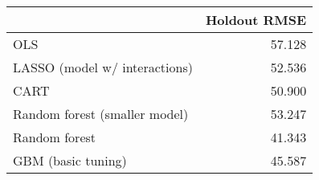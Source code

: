 
\begin{tabular}{lr}
\toprule
  & Holdout RMSE\\
\midrule
OLS & 57.128\\
LASSO (model w/ interactions) & 52.536\\
CART & 50.900\\
Random forest (smaller model) & 53.247\\
Random forest & 41.343\\
GBM (basic tuning) & 45.587\\
\bottomrule
\end{tabular}